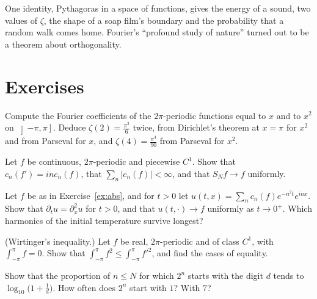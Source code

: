 \begin{beauty}
One identity, Pythagoras in a space of functions, gives the energy of a sound, two values of $\zeta$, the shape of a soap
film's boundary and the probability that a random walk comes home. Fourier's ``profound study of nature'' turned out to
be a theorem about orthogonality.
\end{beauty}

\section{Exercises}

\begin{exercise}[$\star$]\label{ex:x2}
Compute the Fourier coefficients of the $2\pi$-periodic functions equal to $x$ and to $x^2$ on $\left]-\pi,\pi\right]$. Deduce $\zeta(2)=\frac{\pi^2}6$ twice,
from Dirichlet's theorem at $x=\pi$ for $x^2$ and from Parseval for $x$, and $\zeta(4)=\frac{\pi^4}{90}$ from Parseval for $x^2$.
\end{exercise}

\begin{exercise}[$\star\star$]\label{ex:abs}
Let $f$ be continuous, $2\pi$-periodic and piecewise $C^1$. Show that $c_n(f')=inc_n(f)$, that $\sum_n|c_n(f)|<\infty$, and that $S_Nf\to f$
uniformly.
\end{exercise}

\begin{exercise}[$\star\star$]\label{ex:heat}
Let $f$ be as in Exercise~\ref{ex:abs}, and for $t>0$ let $u(t,x)=\sum_nc_n(f)e^{-n^2t}e^{inx}$. Show that $\partial_tu=\partial_x^2u$ for $t>0$, and that
$u(t,\cdot)\to f$ uniformly as $t\to0^+$. Which harmonics of the initial temperature survive longest?
\end{exercise}

\begin{exercise}[$\star\star$]\label{ex:wirtinger}
(Wirtinger's inequality.) Let $f$ be real, $2\pi$-periodic and of class $C^1$, with $\int_{-\pi}^\pi f=0$. Show that $\int_{-\pi}^\pi f^2\le\int_{-\pi}^\pi f'^2$, and find
the cases of equality.
\end{exercise}

\begin{exercise}[$\star\star$]\label{ex:benford}
Show that the proportion of $n\le N$ for which $2^n$ starts with the digit $d$ tends to $\log_{10}\bigl(1+\frac1d\bigr)$. How often does $2^n$ start
with $1$? With $7$?
\end{exercise}

